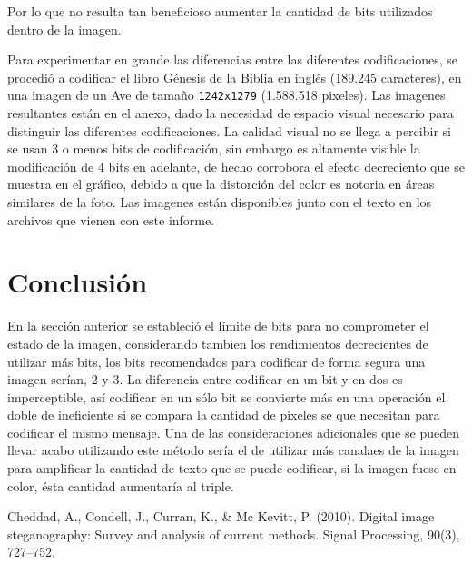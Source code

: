 \documentclass[conference]{IEEEtran}
\begin{document}
	Por lo que no resulta tan beneficioso aumentar la cantidad de bits utilizados dentro de la imagen.
   
   Para experimentar en grande las diferencias entre las diferentes codificaciones, se procedió a codificar el libro Génesis de la Biblia en inglés (189.245 caracteres), en una imagen de un Ave de tamaño \texttt{1242x1279} (1.588.518 pixeles). Las imagenes resultantes están en el anexo, dado la necesidad de espacio visual necesario para distinguir las diferentes codificaciones. La calidad visual no se llega a percibir si se usan 3 o menos bits de codificación, sin embargo es altamente visible la modificación de 4 bits en adelante, de hecho corrobora el efecto decreciento que se muestra en el gráfico, debido a que la distorción del color es notoria en áreas similares de la foto.
   Las imagenes están disponibles junto con el texto en los archivos que vienen con este informe.

\section*{Conclusión}
    En la sección anterior se estableció el límite de bits para no comprometer el estado de la imagen, considerando tambien los rendimientos decrecientes de utilizar más bits, los bits recomendados para codificar de forma segura una imagen serían, 2 y 3. La diferencia entre codificar en un bit y en dos es imperceptible, así codificar en un sólo bit se convierte más en una operación el doble de ineficiente si se compara la cantidad de pixeles se que necesitan para codificar el mismo mensaje.  
    Una de las consideraciones adicionales que se pueden llevar acabo utilizando este método sería el de utilizar más canalaes de la imagen para amplificar la cantidad de texto que se puede codificar, si la imagen fuese en color, ésta cantidad aumentaría al triple.
    
\begin{thebibliography}{99}
 Cheddad, A., Condell, J., Curran, K., \& Mc Kevitt, P. (2010). Digital image 
steganography: Survey and analysis of current methods. Signal Processing, 90(3), 727–752. 


\end{thebibliography}
\end{document}

